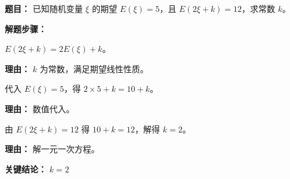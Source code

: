 \begin{examplebox}
	\textbf{\textcolor{CExample}{题目：}} 已知随机变量 $\xi$ 的期望 $E(\xi)=5$，且 $E(2\xi+k)=12$，求常数 $k$。

	\textbf{\textcolor{CExample}{解题步骤：}}
	\begin{description}[style=nextline, leftmargin=2.8em, labelsep=0.5em, itemsep=0.45em]
		\item[\textbf{第一步（应用线性性质）：}] $E(2\xi+k)=2E(\xi)+k$。
		      \par\textbf{理由：} $k$ 为常数，满足期望线性性质。
		\item[\textbf{第二步（代入已知）：}] 代入 $E(\xi)=5$，得 $2\times5+k=10+k$。
		      \par\textbf{理由：} 数值代入。
		\item[\textbf{第三步（列方程求解）：}] 由 $E(2\xi+k)=12$ 得 $10+k=12$，解得 $k=2$。
		      \par\textbf{理由：} 解一元一次方程。
	\end{description}

	\textbf{\textcolor{CExample}{关键结论：}} \textbf{$k=2$}
\end{examplebox}
